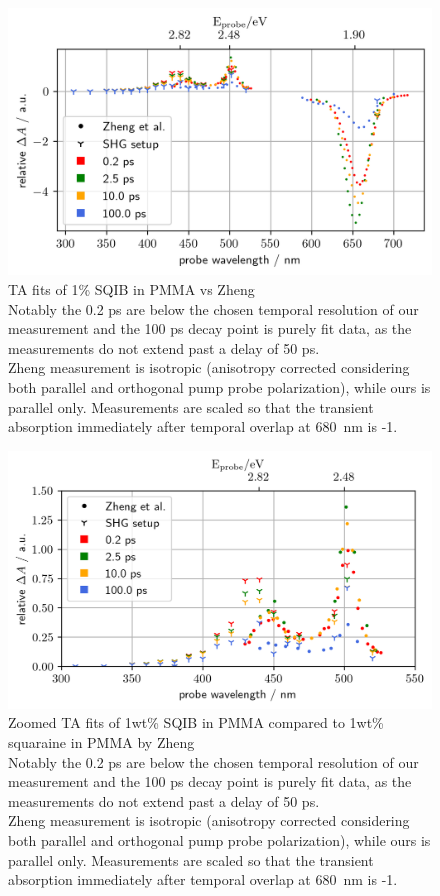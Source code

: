 \documentclass[twoside,openright]{scrreprt}
\begin{document}
\begin{figure}[hbtp]
\centering
\includegraphics[scale=1]{images/wavScanVsZheng.png}
\caption{TA fits of 1\% SQIB in PMMA vs Zheng\protect\cite{Zheng2020}\\ Notably the 0.2 ps are below the chosen temporal resolution of our measurement and the 100 ps decay point is purely fit data, as the measurements do not extend past a delay of 50 ps.\\
Zheng measurement is isotropic (anisotropy corrected considering both parallel and orthogonal pump probe polarization), while ours is parallel only. Measurements are scaled so that the transient absorption immediately after temporal overlap at \SI{680}{\nano\meter} is -1.\label{fig:TA_vsZheng}}
\end{figure}

\begin{figure}[hbtp]
\centering
\includegraphics[scale=1]{images/TimeResolvedWavScanvsZheng_Zoom.png}
\caption{Zoomed TA fits of 1wt\% SQIB in PMMA compared to 1wt\% squaraine in PMMA by Zheng\protect\cite{Zheng2020}\\ Notably the 0.2 ps are below the chosen temporal resolution of our measurement and the 100 ps decay point is purely fit data, as the measurements do not extend past a delay of 50 ps.\\
Zheng measurement is isotropic (anisotropy corrected considering both parallel and orthogonal pump probe polarization), while ours is parallel only. Measurements are scaled so that the transient absorption immediately after temporal overlap at \SI{680}{\nano\meter} is -1.\label{fig:TA_vsZheng_Zoomed}}
\end{figure}
\end{document}
